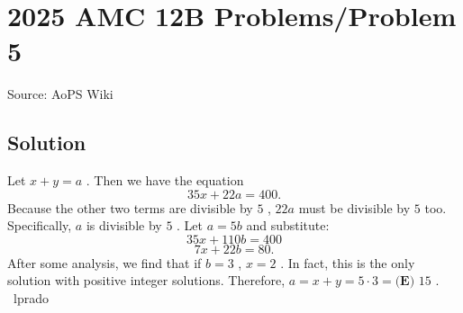 \documentclass[12pt]{article}
\begin{document}
\section*{{2025 AMC 12B Problems/Problem 5}}
Source: AoPS Wiki

\subsection*{Solution}
Let $x+y = a$ . Then we have the equation \[35x + 22a = 400.\] Because the other two terms are divisible by $5$ , $22a$ must be divisible by $5$ too. Specifically, $a$ is divisible by $5$ . Let $a=5b$ and substitute: \[35x + 110b = 400\] \[7x + 22b = 80.\] After some analysis, we find that if $b=3$ , $x = 2$ . In fact, this is the only solution with positive integer solutions. Therefore, $a = x+y = 5 \cdot 3 = \boxed{\textbf{(E) }15}$ . ~lprado
\end{document}
